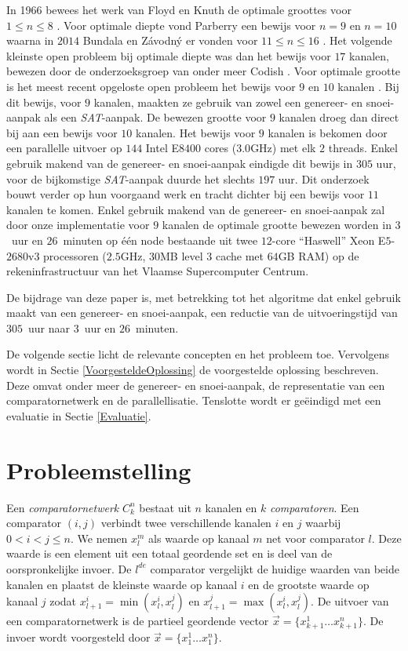 \documentclass{article}
\begin{document}
In 1966 bewees het werk van Floyd en Knuth de optimale groottes voor $1 \leq n \leq 8$ \cite{FloydKnuth}.
Voor optimale diepte vond Parberry een bewijs voor $n = 9$ en $n = 10$ waarna in $2014$ Bundala en Z\'avodn\'y er vonden voor $11 \leq n \leq 16$ \cite{Parberry,BundalaZavodny}.
Het volgende kleinste open probleem bij optimale diepte was dan het bewijs voor $17$ kanalen, bewezen door de onderzoeksgroep van onder meer Codish \cite{CodishBackAgain}.
Voor optimale grootte is het meest recent opgeloste open probleem het bewijs voor $9$ en $10$ kanalen \cite{sortingNetworksSize2014}.
Bij dit bewijs, voor $9$ kanalen, maakten ze gebruik van zowel een genereer- en snoei-aanpak als een \textit{SAT}-aanpak. 
De bewezen grootte voor $9$ kanalen droeg dan direct bij aan een bewijs voor $10$ kanalen. Het bewijs voor $9$ kanalen is bekomen door een parallelle uitvoer op $144$ Intel E$8400$ cores ($3.0$GHz) met elk $2$ threads. Enkel gebruik makend %
van de genereer- en snoei-aanpak eindigde dit bewijs in $305$ uur, voor de bijkomstige \textit{SAT}-aanpak duurde het slechts $197$ uur. 
Dit onderzoek bouwt verder op hun voorgaand werk en tracht dichter bij een bewijs voor $11$ kanalen te komen.
Enkel gebruik makend van de genereer- en snoei-aanpak zal door onze implementatie voor $9$ kanalen de optimale grootte bewezen worden in $3$~uur en $26$~minuten op \'e\'en node bestaande uit twee $12$-core ``Haswell'' Xeon E$5$-$2680$v$3$ processoren ($2.5$GHz, $30$MB level $3$ cache met $64$GB RAM) op de rekeninfrastructuur van het Vlaamse Supercomputer Centrum.

De bijdrage van deze paper is, met betrekking tot het algoritme dat enkel gebruik maakt van een genereer- en snoei-aanpak, een reductie van de uitvoeringstijd van $305$~uur naar $3$~uur en $26$~minuten.

De volgende sectie licht de relevante concepten en het probleem toe.
Vervolgens wordt in Sectie \ref{VoorgesteldeOplossing} de voorgestelde oplossing beschreven.
Deze omvat onder meer de genereer- en snoei-aanpak, de representatie van een comparatornetwerk en de parallellisatie.
Tenslotte wordt er ge\"eindigd met een evaluatie in Sectie \ref{Evaluatie}.

\section{Probleemstelling}
Een \textit{comparatornetwerk} $C^n_k$ bestaat uit $n$ kanalen en $k$ \textit{comparatoren}.
Een comparator $\left(i, j\right)$ verbindt twee verschillende kanalen $i$ en $j$ waarbij $0 < i < j \leq n$.
We nemen $x_l^m$ als waarde op kanaal $m$ net voor comparator $l$.
Deze waarde is een element uit een totaal geordende set en is deel van de oorspronkelijke invoer. 
De $l^{de}$ comparator  vergelijkt de huidige waarden van beide kanalen en plaatst de kleinste waarde op kanaal $i$ en de grootste waarde op kanaal $j$ zodat $x_{l+1}^i = \min(x_l^i,x_l^j)$ en $x_{l+1}^j = \max(x_l^i,x_l^j)$.
De uitvoer van een comparatornetwerk is de partieel geordende vector $\vec{x} = \{x^1_{k+1} \dots x^n_{k+1} \} $.
De invoer wordt voorgesteld door $\vec{x} = \{x^1_{1} \dots x^n_{1} \} $. 
\end{document}
